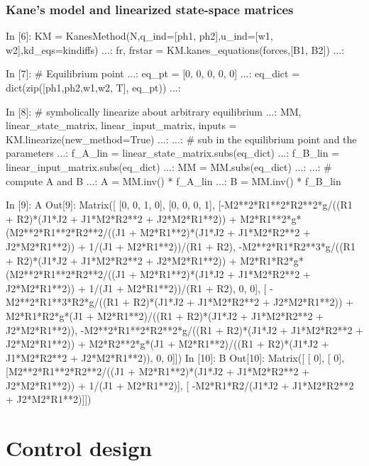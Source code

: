 \subsection{Kane's model and linearized state-space matrices}
\begin{code}
In [6]: KM = KanesMethod(N,q_ind=[ph1, ph2],u_ind=[w1, w2],kd_eqs=kindiffs)
   ...: fr, frstar = KM.kanes_equations(forces,[B1, B2])
   ...: 

In [7]: # Equilibrium point
   ...: eq_pt = [0, 0, 0, 0, 0]
   ...: eq_dict = dict(zip([ph1,ph2,w1,w2, T], eq_pt))
   ...: 

In [8]: # symbolically linearize about arbitrary equilibrium
   ...: MM, linear_state_matrix, linear_input_matrix, inputs = 
KM.linearize(new_method=True)
   ...: 
   ...: # sub in the equilibrium point and the parameters
   ...: f_A_lin = linear_state_matrix.subs(eq_dict)
   ...: f_B_lin = linear_input_matrix.subs(eq_dict)
   ...: MM = MM.subs(eq_dict)
   ...: 
   ...: # compute A and B
   ...: A = MM.inv() * f_A_lin
   ...: B = MM.inv() * f_B_lin
\end{code}

\begin{code}
In [9]: A
Out[9]: 
Matrix([
[0, 0, 1, 0],
[0, 0, 0, 1],
[-M2**2*R1**2*R2**2*g/((R1 + R2)*(J1*J2 + J1*M2*R2**2 + J2*M2*R1**2)) + 
M2*R1**2*g*(M2**2*R1**2*R2**2/((J1 + M2*R1**2)*(J1*J2 + J1*M2*R2**2 + 
J2*M2*R1**2)) + 1/(J1 + M2*R1**2))/(R1 + R2), -M2**2*R1*R2**3*g/((R1 + 
R2)*(J1*J2 + J1*M2*R2**2 + J2*M2*R1**2)) + M2*R1*R2*g*(M2**2*R1**2*R2**2/((J1 + 
M2*R1**2)*(J1*J2 + J1*M2*R2**2 + J2*M2*R1**2)) + 1/(J1 + M2*R1**2))/(R1 + R2), 
0, 0],
[                                           -M2**2*R1**3*R2*g/((R1 + R2)*(J1*J2 
+ J1*M2*R2**2 + J2*M2*R1**2)) + M2*R1*R2*g*(J1 + M2*R1**2)/((R1 + R2)*(J1*J2 + 
J1*M2*R2**2 + J2*M2*R1**2)),                                      
-M2**2*R1**2*R2**2*g/((R1 + R2)*(J1*J2 + J1*M2*R2**2 + J2*M2*R1**2)) + 
M2*R2**2*g*(J1 + M2*R1**2)/((R1 + R2)*(J1*J2 + J1*M2*R2**2 + J2*M2*R1**2)), 0, 
0]])
In [10]: B
Out[10]: 
Matrix([
[                                                                               
           0],
[                                                                               
           0],
[M2**2*R1**2*R2**2/((J1 + M2*R1**2)*(J1*J2 + J1*M2*R2**2 + J2*M2*R1**2)) + 
1/(J1 + M2*R1**2)],
[                                              -M2*R1*R2/(J1*J2 + J1*M2*R2**2 + 
J2*M2*R1**2)]])
\end{code}

\chapter{Control design}


